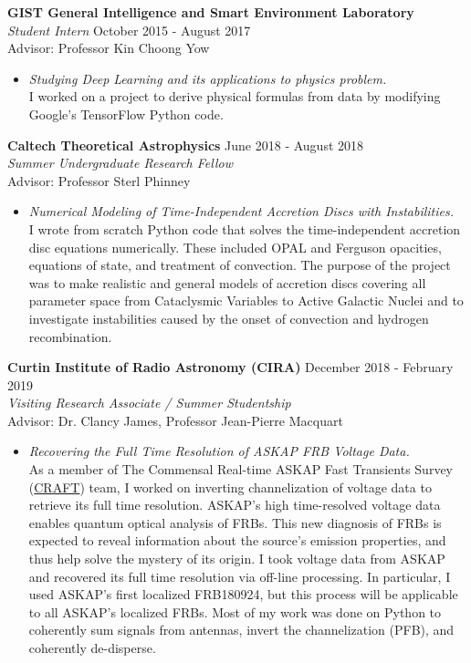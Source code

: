 \documentclass[margin, 10pt]{res} %
\begin{document}
\begin{resume}
{\bf GIST General Intelligence and Smart Environment Laboratory}\\
{\sl Student Intern} \hfill October 2015 - August 2017 \\
Advisor: Professor Kin Choong Yow
\begin{itemize}
\item[] {\sl Studying Deep Learning and its applications to physics problem.}\\
I worked on a project to derive physical formulas from data by modifying Google's TensorFlow Python code.
\end{itemize} 

{\bf Caltech Theoretical Astrophysics} \hfill June 2018 - August 2018 \\
{\sl Summer Undergraduate Research Fellow} \\
Advisor: Professor Sterl Phinney
\begin{itemize}
\item[] {\sl Numerical Modeling of Time-Independent Accretion Discs with Instabilities.}\\
I wrote from scratch Python code that solves the time-independent accretion disc equations numerically. These included OPAL and Ferguson opacities, equations of state, and treatment of convection. The purpose of the project was to make realistic and general models of accretion discs covering all parameter space from Cataclysmic Variables to Active Galactic Nuclei and to investigate instabilities caused by the onset of convection and hydrogen recombination.
\end{itemize} 

{\bf Curtin Institute of Radio Astronomy (CIRA)} \hfill December 2018 - February 2019 \\
{\sl Visiting Research Associate / Summer Studentship} \\
Advisor: Dr. Clancy James, Professor Jean-Pierre Macquart
\begin{itemize}
\item[] {\sl Recovering the Full Time Resolution of ASKAP FRB Voltage Data.}\\
As a member of The Commensal Real-time ASKAP Fast Transients Survey (\href{http://astronomy.curtin.edu.au/research/craft/}{CRAFT}) team, I worked on inverting channelization of voltage data to retrieve its full time resolution. ASKAP's high time-resolved voltage data enables quantum optical analysis of FRBs. This new diagnosis of FRBs is expected to reveal information about the source's emission properties, and thus help solve the mystery of its origin. I took voltage data from ASKAP and recovered its full time resolution via off-line processing. In particular, I used ASKAP's first localized FRB180924, but this process will be applicable to all ASKAP's localized FRBs. Most of my work was done on Python to coherently sum signals from antennas, invert the channelization (PFB), and coherently de-disperse.
\end{itemize} 


\end{resume}
\end{document}
